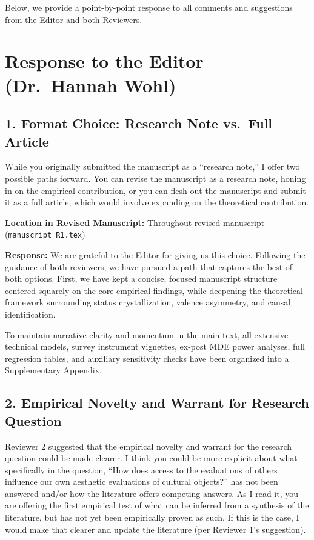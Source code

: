\documentclass[11pt, letterpaper]{article}
\begin{document}
Below, we provide a point-by-point response to all comments and suggestions from the Editor and both Reviewers.

\vspace{15pt}

\section*{Response to the Editor (Dr.~Hannah Wohl)}

\subsection*{1. Format Choice: Research Note vs.~Full Article}

\begin{reviewercomment}
While you originally submitted the manuscript as a ``research note,'' I offer two possible paths forward. You can revise the manuscript as a research note, honing in on the empirical contribution, or you can flesh out the manuscript and submit it as a full article, which would involve expanding on the theoretical contribution.
\end{reviewercomment}

\textbf{Location in Revised Manuscript:} Throughout revised manuscript (\texttt{manuscript\_R1.tex})

\textbf{Response:}
We are grateful to the Editor for giving us this choice. Following the guidance of both reviewers, we have pursued a path that captures the best of both options. First, we have kept a concise, focused manuscript structure centered squarely on the core empirical findings, while deepening the theoretical framework surrounding status crystallization, valence asymmetry, and causal identification.

To maintain narrative clarity and momentum in the main text, all extensive technical models, survey instrument vignettes, ex-post MDE power analyses, full regression tables, and auxiliary sensitivity checks have been organized into a Supplementary Appendix.

\vspace{10pt}

\subsection*{2. Empirical Novelty and Warrant for Research Question}

\begin{reviewercomment}
Reviewer 2 suggested that the empirical novelty and warrant for the research question could be made clearer. I think you could be more explicit about what specifically in the question, ``How does access to the evaluations of others influence our own aesthetic evaluations of cultural objects?'' has not been answered and/or how the literature offers competing answers. As I read it, you are offering the first empirical test of what can be inferred from a synthesis of the literature, but has not yet been empirically proven as such. If this is the case, I would make that clearer and update the literature (per Reviewer 1's suggestion).
\end{reviewercomment}
\end{document}
